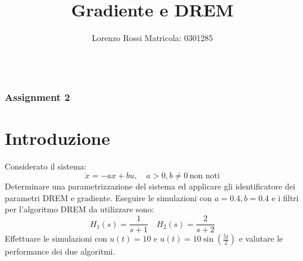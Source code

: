 \documentclass{beamer}
\title[Assignments 2]{Gradiente e DREM}
\author{Lorenzo Rossi Matricola: 0301285}
\begin{document}
\begin{frame}
	\titlepage{}
\end{frame}
\begin{frame}
	\begin{columns}[t]
		\begin{column}{.5\textwidth}
			\tableofcontents[sections={1-3}] %
		\end{column}
		\begin{column}{.5\textwidth}
			\tableofcontents[sections={4-5}] %
		\end{column}
	\end{columns}
\end{frame}
\begin{frame}
	\frametitle{Assignment 2}
	\section{Introduzione}
	Considerato il sistema:\begin{equation*}
		\dot{x}=-ax+bu,\quad a>0,b\neq{0}\:\text{non noti}
	\end{equation*}
	Determinare una parametrizzazione del sistema ed applicare gli identificatore dei parametri DREM e gradiente.
	Eseguire le simulazioni con \(a=0.4,b=0.4\) e i filtri per l'algoritmo DREM da utilizzare sono:
	\begin{equation*}
		H_{1}(s)=\frac{1}{s+1}\quad H_{2}(s)=\frac{2}{s+2}
	\end{equation*}
	Effettuare le simulazioni con \(u(t)=10\) e \(u(t)=10\sin{(\frac{5t}{2})}\) e valutare le performance dei due algoritmi.
\end{frame}
\end{document}
